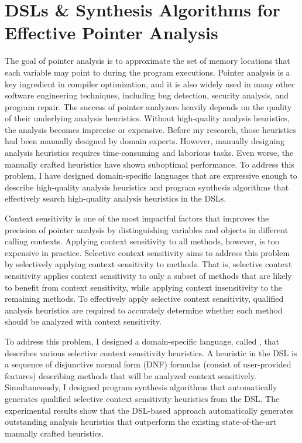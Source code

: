 \documentclass[11pt]{article}
\newcommand{\myparagraph}[1]{\medskip\noindent{\it \textbf{#1.}}}
\begin{document}
\section{DSLs \& Synthesis Algorithms for Effective Pointer Analysis}
%
The goal of pointer analysis is to approximate the set of memory locations that each variable may point to during the program executions.
%
Pointer analysis is a key ingredient in compiler optimization, and it is also widely used in many other software engineering techniques, including bug detection, security analysis, and program repair.
%
The success of pointer analyzers heavily depends on the quality of their underlying analysis heuristics.
%
Without high-quality analysis heuristics, the analysis becomes imprecise or expensive.
%
Before my research, those heuristics had been manually designed by domain experts. 
%
However, manually designing analysis heuristics requires time-consuming and laborious tasks.
%
Even worse, the manually crafted heuristics have shown suboptimal performance.
%
To address this problem, I have designed domain-specific languages that are expressive enough to describe high-quality analysis heuristics and program synthesis algorithms that effectively search  high-quality analysis heuristics in the DSLs.



\myparagraph{Disjunctive Model $\&$ Synthesis Algorithms~\cite{JeJeChOh17,Jeon2019,IST2021}}
%
Context sensitivity is one of the most impactful factors that improves the precision of pointer analysis by distinguishing variables and objects in different calling contexts.
%
Applying context sensitivity to all methods, however, is too expensive in practice.
%
Selective context sensitivity aims to address this problem by selectively applying context sensitivity to methods.
%
That is, selective context sensitivity applies context sensitivity to only a subset of methods that are likely to benefit from context sensitivity, while applying context insensitivity to the remaining methods.
%
To effectively apply selective context sensitivity, qualified analysis heuristics are required to accurately determine whether each method should be analyzed with context sensitivity.




To address this problem, I designed a domain-specific language, called \DisjunctiveModel, that describes various selective context sensitivity heuristics.
%
A heuristic in the DSL is a sequence of disjunctive normal form (DNF) formulas (consist of user-provided features) describing methods that will be analyzed context sensitively.
%
Simultaneously, I designed program synthesis algorithms that automatically generates qualified selective context sensitivity heuristics from the DSL.
%
The experimental results show that the DSL-based approach automatically generates outstanding analysis heuristics that outperform the existing state-of-the-art manually crafted heuristics.
%
\end{document}
